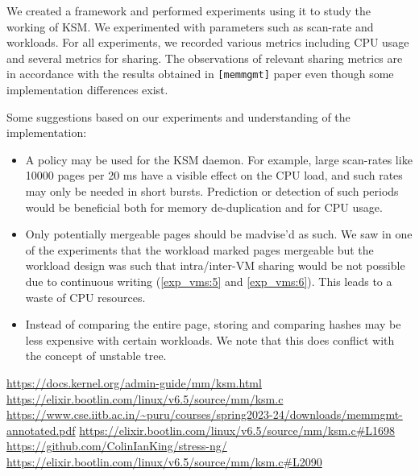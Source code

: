 \documentclass{article}
\begin{document}
We created a framework and performed experiments using it to study the working of KSM. We experimented with parameters such as scan-rate and workloads. For all experiments, we recorded various metrics including CPU usage and several metrics for sharing. The observations of relevant sharing metrics are in accordance with the results obtained in \texttt{[memmgmt]} paper \cite{memmgmt} even though some implementation differences exist.

Some suggestions based on our experiments and understanding of the implementation: 
\begin{itemize}
    \item A policy may be used for the KSM daemon. For example, large scan-rates like 10000 pages per 20 ms have a visible effect on the CPU load, and such rates may only be needed in short bursts. Prediction or detection of such periods would be beneficial both for memory de-duplication and for CPU usage.
    \item Only potentially mergeable pages should be madvise'd as such. We saw in one of the experiments that the workload marked pages mergeable but the workload design was such that intra/inter-VM sharing would be not possible due to continuous writing (\ref{exp_vms:5} and \ref{exp_vms:6}). This leads to a waste of CPU resources.
    \item Instead of comparing the entire page, storing and comparing hashes may be less expensive with certain workloads. We note that this does conflict with the concept of unstable tree.
\end{itemize}

\begin{thebibliography}{9}
 \url{https://docs.kernel.org/admin-guide/mm/ksm.html}
 \url{https://elixir.bootlin.com/linux/v6.5/source/mm/ksm.c}
 \url{https://www.cse.iitb.ac.in/~puru/courses/spring2023-24/downloads/memmgmt-annotated.pdf}
 \url{https://elixir.bootlin.com/linux/v6.5/source/mm/ksm.c#L1698}
 \url{https://github.com/ColinIanKing/stress-ng/}
 \url{https://elixir.bootlin.com/linux/v6.5/source/mm/ksm.c#L2090}
\end{thebibliography}
\end{document}
